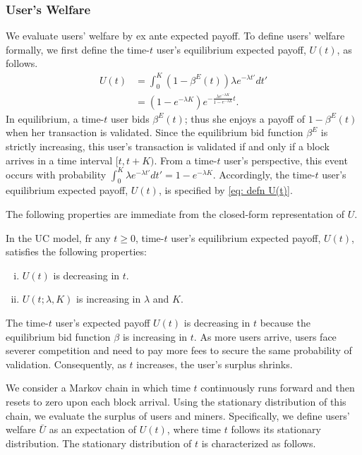\documentclass[12pt, letterpaper]{article}
\begin{document}
\subsubsection{User's Welfare}

We evaluate users' welfare by ex ante expected payoff. To define users' welfare formally, we first define the time-$t$ user's equilibrium expected payoff, $U(t)$, as follows.
\begin{align}
    U(t) &= \int_0^K (1 - \beta^E(t)) \lambda e^{-\lambda t'}dt' \label{eq: defn U(t)}\\
     &= \left(1 - e^{-\lambda K} \right) e^{- \frac{\lambda e^{-\lambda K}}{1 - e^{-\lambda K}}t}.
\end{align}
In equilibrium, a time-$t$ user bids $\beta^E(t)$; thus she enjoys a payoff of $1 - \beta^E(t)$ when her transaction is validated. Since the equilibrium bid function $\beta^E$ is strictly increasing, this user's transaction is validated if and only if a block arrives in a time interval $[t, t + K)$. From a time-$t$ user's perspective, this event occurs with probability $\int_0^K \lambda e^{-\lambda t'}dt' = 1 - e^{-\lambda K}$. Accordingly, the time-$t$ user's equilibrium expected payoff, $U(t)$, is specified by \eqref{eq: defn U(t)}.

The following properties are immediate from the closed-form representation of $U$.
\begin{prop}
In the UC model, fr any $t\geq 0$, time-$t$ user's equilibrium expected payoff, $U(t)$, satisfies the following properties:
    \begin{enumerate}[(i)]
        \item $U(t)$ is decreasing in $t$.
        \item $U(t; \lambda, K)$ is increasing in $\lambda$ and $K$.
    \end{enumerate}
\end{prop}

The time-$t$ user's expected payoff $U(t)$ is decreasing in $t$ because the equilibrium bid function $\beta$ is increasing in $t$. As more users arrive, users face severer competition and need to pay more fees to secure the same probability of validation. Consequently, as $t$ increases, the user's surplus shrinks.

We consider a Markov chain in which time $t$ continuously runs forward and then resets to zero upon each block arrival. Using the stationary distribution of this chain, we evaluate the surplus of users and miners. Specifically, we define users' welfare $\bar{U}$ as an expectation of $U(t)$, where time $t$ follows its stationary distribution. The stationary distribution of $t$ is characterized as follows.
\end{document}
